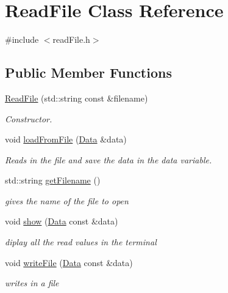 \hypertarget{class_read_file}{}\section{Read\+File Class Reference}
\label{class_read_file}


{\ttfamily \#include $<$read\+File.\+h$>$}

\subsection*{Public Member Functions}
\begin{DoxyCompactItemize}
\item 
\mbox{\hyperlink{class_read_file_ae297f0539380fc9b703a1bceda2ce820}{Read\+File}} (std\+::string const \&filename)
\begin{DoxyCompactList}\small\item\em Constructor. \end{DoxyCompactList}\item 
void \mbox{\hyperlink{class_read_file_a232df426223b84e4dbb3f964ee4c3177}{load\+From\+File}} (\mbox{\hyperlink{struct_data}{Data}} \&data)
\begin{DoxyCompactList}\small\item\em Reads in the file and save the data in the data variable. \end{DoxyCompactList}\item 
std\+::string \mbox{\hyperlink{class_read_file_a9835264c9ec95cfdbc1349573402fc01}{get\+Filename}} ()
\begin{DoxyCompactList}\small\item\em gives the name of the file to open \end{DoxyCompactList}\item 
void \mbox{\hyperlink{class_read_file_a5efc41b900510ae038dafc23a2563300}{show}} (\mbox{\hyperlink{struct_data}{Data}} const \&data)
\begin{DoxyCompactList}\small\item\em diplay all the read values in the terminal \end{DoxyCompactList}\item 
void \mbox{\hyperlink{class_read_file_ac11779a3630a2c1d62ab4566abb4034a}{write\+File}} (\mbox{\hyperlink{struct_data}{Data}} const \&data)
\begin{DoxyCompactList}\small\item\em writes in a file \end{DoxyCompactList}\end{DoxyCompactItemize}


